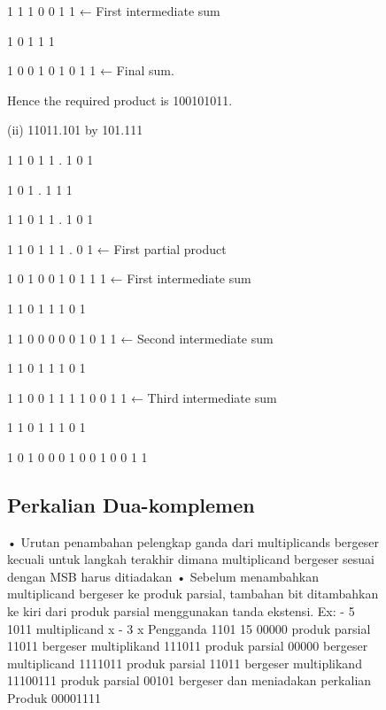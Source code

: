 \begin{figure}[ht]
{                            1 1 1 0 0 1 1           ← First intermediate sum

                         1 0 1 1 1          

                       1 0 0 1 0 1 0 1 1           ← Final sum.

Hence the required product is 100101011.


(ii) 11011.101 by 101.111

                                        1 1 0 1 1 . 1 0 1

                                             1 0 1 . 1 1 1  

                                        1 1 0 1 1 . 1 0 1

                                     1 1 0 1 1 1 . 0 1          ← First partial product

                                  1 0 1 0 0 1 0   1 1 1        ← First intermediate sum

                                  1 1 0 1 1 1 0   1        

                               1 1 0 0 0 0 0 1   0 1 1    ← Second intermediate sum

                               1 1 0 1 1 1 0 1              

                             1 1 0 0 1 1 1 1 0   0 1 1        ← Third intermediate sum

                          1 1 0 1 1 1 0 1                    

                       1 0 1 0 0 0 1 0 0 1 0   0 1 1
		     
\subsection {Perkalian Dua-komplemen}
•
Urutan penambahan pelengkap ganda dari multiplicands bergeser
kecuali untuk langkah terakhir dimana multiplicand bergeser sesuai dengan MSB
harus ditiadakan
•
Sebelum menambahkan multiplicand bergeser ke produk parsial, tambahan
bit ditambahkan ke kiri dari produk parsial menggunakan tanda ekstensi.
Ex:
- 5 1011 multiplicand
x
- 3 x
 Pengganda 1101
 15 00000 produk parsial
                                            11011 bergeser multiplikand
                                          111011 produk parsial
                                         00000 bergeser multiplicand
                                       1111011 produk parsial
                                       11011 bergeser multiplikand
                                     11100111 produk parsial
                                     00101 bergeser dan meniadakan perkalian
                                     Produk 00001111
									 

}
\end{figure}

